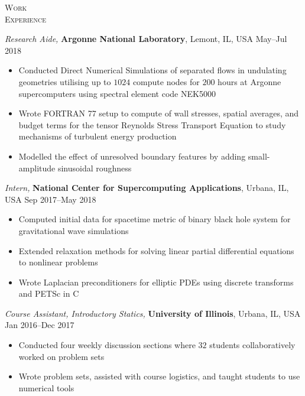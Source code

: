 \documentclass[10pt]{article}
\begin{document}
\begin{multicols}{2}
\textsc{\small Work \\ Experience}
\columnbreak

{\sl Research Aide,} \textbf{Argonne National Laboratory}, Lemont, IL, USA \hfill May--Jul 2018

\vspace{-1.75em}
\begin{itemize}[label=-]
    \setlength\itemsep{-0.25em}
    \item Conducted Direct Numerical Simulations of separated flows in undulating geometries utilising up to $1024$ compute nodes for $200$ hours at Argonne supercomputers using spectral element code NEK5000
    \item Wrote FORTRAN 77 setup to compute of wall stresses, spatial averages, and budget terms for the tensor Reynolds Stress Transport Equation to study mechanisms of turbulent energy production
    \item Modelled the effect of unresolved boundary features by adding small-amplitude sinusoidal roughness
\end{itemize}
\vspace{-2.0em}

\vspace{0.5em}
%
{\sl Intern,} \textbf{National Center for Supercomputing Applications}, Urbana, IL, USA \hfill Sep 2017--May 2018

\vspace{-1.75em}
\begin{itemize}[label=-]
    \setlength\itemsep{-0.25em}
    \item Computed initial data for spacetime metric of binary black hole system for gravitational wave simulations
    \item Extended relaxation methods for solving linear partial differential equations to nonlinear problems
    \item Wrote Laplacian preconditioners for elliptic PDEs using discrete transforms and PETSc in C
\end{itemize}
\vspace{-2.0em}

\vspace{0.5em}
%
{\sl Course Assistant, Introductory Statics,} \textbf{University of Illinois}, Urbana, IL, USA \hfill Jan 2016--Dec 2017

\vspace{-1.75em}
\begin{itemize}[label=-]
    \setlength\itemsep{-0.25em}
    \item Conducted four weekly discussion sections where $32$ students collaboratively worked on problem sets
    \item Wrote problem sets, assisted with course logistics, and taught students to use numerical tools
\end{itemize}
\vspace{-2.0em}

\end{multicols}
\end{document}
